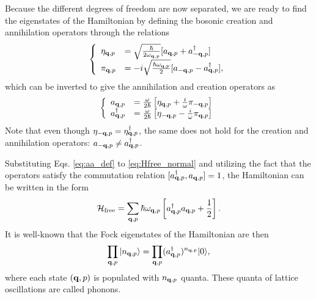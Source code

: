Because the different degrees of freedom are now separated, we are ready to find the eigenstates of the Hamiltonian by defining the bosonic creation and annihilation operators through the relations
\begin{equation}
 \left\{
\begin{array}{ll}
  \eta_{\mathbf{q},p} &= \sqrt{\frac{\hbar}{2\omega_{\mathbf{q},p}}}[a_{\mathbf{q},p}+a_{-\mathbf{q},p}^{\dagger}] \\
  \pi_{\mathbf{q},p} &= -i \sqrt{\frac{\hbar \omega_{\mathbf{q},p}}{2}}[a_{-\mathbf{q},p}-a_{\mathbf{q},p}^{\dagger}],
  \end{array}
\right.
\label{eq:aa_def}
\end{equation}
which can be inverted to give the annihilation and creation operators as
\begin{equation}
 \left\{
\begin{array}{ll}
  a_{\mathbf{q},p} &= \frac{\omega}{2\hbar} \left[ \eta_{\mathbf{q},p} + \frac{i}{\omega} \pi_{-\mathbf{q},p} \right] \\
  a_{\mathbf{q},p}^{\dagger} &= \frac{\omega}{2\hbar} \left[ \eta_{-\mathbf{q},p} - \frac{i}{\omega} \pi_{\mathbf{q},p} \right]
\end{array}
\right.
\end{equation}
Note that even though $\eta_{\mathbf{-q},p}=\eta_{\mathbf{q},p}^{\dagger}$, the same does not hold for the creation and annihilation operators: $a_{-\mathbf{q},p} \neq a_{\mathbf{q},p}^{\dagger}$.

Substituting Eqs. \eqref{eq:aa_def} to \eqref{eq:Hfree_normal} and utilizing the fact that the operators satisfy the commutation relation $[a_{\mathbf{q},p}^{\dagger},a_{\mathbf{q},p}]=1$, the Hamiltonian can be written in the form
\begin{equation}
 \mathcal{H}_{\textrm{free}} = \sum_{\mathbf{q},p} \hbar \omega_{\mathbf{q},p} \left[ a_{\mathbf{q},p}^{\dagger} a_{\mathbf{q},p} + \frac{1}{2} \right] .
\end{equation}
It is well-known that the Fock eigenstates of the Hamiltonian are then
\begin{equation}
 \prod_{\mathbf{q},p} |n_{\mathbf{q},p} \rangle = \prod_{\mathbf{q},p} (a_{\mathbf{q},p}^{\dagger})^{n_{\mathbf{q},p}} |0 \rangle,
\end{equation}
where each state $(\mathbf{q},p)$ is populated with $n_{\mathbf{q},p}$ quanta. These quanta of lattice oscillations are called phonons.


